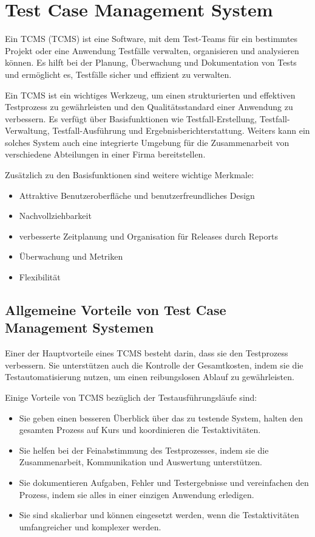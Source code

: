 \documentclass[a4paper, fontsize=11pt, parskip=half, twoside]{scrreprt}
\begin{document}
	\section{Test Case Management System} \label{sec:tcms}
	Ein \acl{TCMS} (\ac{TCMS}) ist eine Software, mit dem Test-Teams für ein bestimmtes Projekt oder eine Anwendung Testfälle verwalten, organisieren und analysieren können.
	Es hilft bei der Planung, Überwachung und Dokumentation von Tests und ermöglicht es, Testfälle sicher und effizient zu verwalten.
	
	Ein \ac{TCMS} ist ein wichtiges Werkzeug, um einen strukturierten und effektiven Testprozess zu gewährleisten und den Qualitätsstandard einer Anwendung zu verbessern.
	Es verfügt über Basisfunktionen wie Testfall-Erstellung, Testfall-Verwaltung, Testfall-Ausführung und Ergebnisberichterstattung. 
	Weiters kann ein solches System auch eine integrierte Umgebung für die Zusammenarbeit von verschiedene Abteilungen in einer Firma bereitstellen.
	
	Zusätzlich zu den Basisfunktionen sind weitere wichtige Merkmale:
	
	\begin{itemize}
		\item Attraktive Benutzeroberfläche und benutzerfreundliches Design
		\item Nachvollziehbarkeit
		\item verbesserte Zeitplanung und Organisation für Releases durch Reports
		\item Überwachung und Metriken
		\item Flexibilität
	\end{itemize}
	
	\textcite{lead_articles_nodate}	
	
	
	\subsection{Allgemeine Vorteile von Test Case Management Systemen}
	Einer der Hauptvorteile eines \ac{TCMS} besteht darin, dass sie den Testprozess verbessern. 
	Sie unterstützen auch die Kontrolle der Gesamtkosten, indem sie die Testautomatisierung nutzen, um einen reibungslosen Ablauf zu gewährleisten.  
	
	Einige Vorteile von \ac{TCMS} bezüglich der Testausführungsläufe sind:
	
	\begin{itemize}
		\item Sie geben einen besseren Überblick über das zu testende System, halten den gesamten Prozess auf Kurs und koordinieren die Testaktivitäten.
		\item Sie helfen bei der Feinabstimmung des Testprozesses, indem sie die Zusammenarbeit, Kommunikation und Auswertung unterstützen.
		\item Sie dokumentieren Aufgaben, Fehler und Testergebnisse und vereinfachen den Prozess, indem sie alles in einer einzigen Anwendung erledigen.
		\item Sie sind skalierbar und können eingesetzt werden, wenn die Testaktivitäten umfangreicher und komplexer werden.
	\end{itemize}
\end{document}
